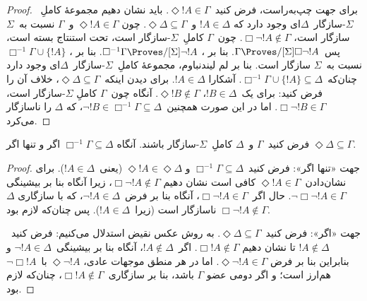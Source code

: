 \documentclass[../../../include/open-logic-section]{subfiles}
\begin{document}
{\begin{proof}
  برای جهت چپ‌به‌راست، فرض کنید~$\Diamond !A \in \Gamma$. باید نشان
  دهیم مجموعهٔ کاملِ~$\Sigma$-سازگار~$\Delta$ای وجود دارد که
  $!A \in \Delta$ و~$\Diamond\Delta \subseteq \Gamma$. چون
  $\Diamond !A \in \Gamma$ و~$\Gamma$ نسبت به~$\Sigma$ سازگار است،
  $\Box\lnot !A \notin \Gamma$. چون~$\Gamma$ کاملِ~$\Sigma$-سازگار
  است، تحت استنتاج بسته است، پس~$\Gamma \Proves/[\Sigma]
  \Box\lnot !A$. بنا بر ،
  $\Box^{-1}\Gamma \Proves/[\Sigma] \lnot !A$. بنا بر
  ،
  $\Box^{-1}\Gamma \cup \{ !A \}$ نسبت به~$\Sigma$ سازگار است. بنا
  بر لم لیندنباوم، مجموعهٔ کاملِ~$\Sigma$-سازگار~$\Delta$ای وجود دارد
  چنان‌که~$\Box^{-1}\Gamma \cup \{ !A \} \subseteq \Delta$. آشکارا
  $!A \in \Delta$. برای دیدن اینکه~$\Diamond\Delta \subseteq
  \Gamma$، خلاف آن را فرض کنید: برای یک~$!B \in \Delta$،
  $\Diamond !B \notin \Gamma$. آنگاه چون~$\Gamma$ کاملِ
  $\Sigma$-سازگار است، $\Box\lnot !B \in \Gamma$. اما در این صورت
  همچنین~$\lnot !B \in \Box^{-1}\Gamma \subseteq \Delta$، که
  $\Delta$ را ناسازگار می‌کرد.
\end{proof}
}

\begin{lem}
  فرض کنید~$\Gamma$ و~$\Delta$ کاملِ~$\Sigma$-سازگار باشند. آنگاه
  $\Box^{-1}\Gamma \subseteq \Delta$ اگر و تنها اگر
  $\Diamond\Delta \subseteq \Gamma$.
\end{lem}

\begin{proof}
  جهت «تنها اگر»: فرض کنید~$\Box^{-1}\Gamma \subseteq \Delta$ و
  $\Diamond!A \in \Diamond\Delta$ (یعنی~$!A \in \Delta$). برای
  نشان‌دادن~$\Diamond!A \in \Gamma$ کافی است نشان دهیم
  $\Box\lnot!A \notin \Gamma$، زیرا آنگاه بنا بر بیشینگی
  $\lnot\Box\lnot !A \in \Gamma$. حال اگر~$\Box\lnot!A \in
  \Gamma$، آنگاه بنا بر فرض~$\lnot!A \in \Delta$، که با سازگاری
  $\Delta$ ناسازگار است (زیرا~$!A \in \Delta$). پس چنان‌که لازم بود
  $\Box\lnot!A \notin \Gamma$.

  جهت «اگر»: فرض کنید~$\Diamond\Delta \subseteq \Gamma$. به روش عکس
  نقیض استدلال می‌کنیم: فرض کنید~$!A \notin \Delta$ تا نشان دهیم
  $\Box!A \notin \Gamma$. اگر~$!A \notin \Delta$، آنگاه بنا بر
  بیشینگی~$\lnot!A \in \Delta$ و بنابراین بنا بر فرض
  $\Diamond\lnot!A \in \Gamma$. اما در هر منطق موجهات عادی،
  $\Diamond\lnot!A$ با~$\lnot\Box !A$ هم‌ارز است؛ و اگر دومی عضو
  $\Gamma$ باشد، بنا بر سازگاری~$\Box!A \notin\Gamma$، چنان‌که لازم
  بود.
\end{proof}
\end{document}
